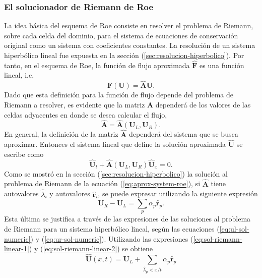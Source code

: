 \subsubsection{El solucionador de Riemann de Roe}
La idea básica del esquema de Roe consiste en resolver el problema de Riemann, sobre cada celda del dominio, para el sistema de ecuaciones de conservación original como un sistema con coeficientes constantes. La resolución de un sistema hiperbólico lineal fue expuesta en la sección (\ref{sec:resolucion-hiperbolico}). Por tanto, en el esquema de Roe, la función de flujo aproximada $\mathbf{\hat{F}}$ es una función lineal, i.e, 
\begin{equation}
	\mathbf{\hat{F}}(\mathbf{U}) = \mathbf{\hat{A}}\mathbf{U}.
	\label{eq:aprox-flux-roe}
\end{equation}
Dado que esta definición para la función de flujo depende del problema de Riemann a resolver, es evidente que la matriz $\mathbf{\hat{A}}$ dependerá de los valores de las celdas adyacentes en donde se desea calcular el flujo,
\begin{equation}
	\mathbf{\hat{A}} = \mathbf{\hat{A}}(\mathbf{U}_L, \mathbf{U}_R).
\end{equation}
En general, la definición de la matriz $\mathbf{\hat{A}}$ dependerá del sistema que se busca aproximar. Entonces el sistema lineal que define la solución aproximada $\mathbf{\hat{U}}$ se escribe como
\begin{equation}
	\mathbf{\hat{U}}_t + \mathbf{\hat{A}}(\mathbf{U}_L, \mathbf{U}_R)\mathbf{\hat{U}}_x = 0.
	\label{eq:aprox-system-roe}
\end{equation}
Como se mostró en la sección (\ref{sec:resolucion-hiperbolico}) la solución al problema de Riemann de la ecuación (\ref{eq:aprox-system-roe}), si $\mathbf{\hat{A}}$ tiene autovalores $\hat{\lambda}_i$ y autovalores $\mathbf{\hat{r}}_{i}$, se puede expresar utilizando la siguiente expresión
\begin{equation}
	\mathbf{U}_R - \mathbf{U}_L = \sum_{p} {\alpha}_p \mathbf{\hat{r}}_{p}.
\end{equation}
Esta última se justifica a través de las expresiones de las soluciones al problema de Riemann para un sistema hiperbólico lineal, según las ecuaciones (\ref{eq:ul-sol-numeric}) y (\ref{eq:ur-sol-numeric}). Utilizando las expresiones (\ref{eq:sol-riemann-linear-1}) y (\ref{eq:sol-riemann-linear-2}) se obtiene
\begin{equation}
	\mathbf{\hat{U}} (x,t) = \mathbf{U}_L + \sum_{\hat{\lambda}_{p}<x/t}\alpha_{p}\mathbf{\hat{r}}_{p}
\end{equation}
